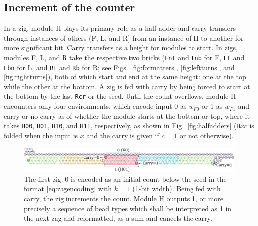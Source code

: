 \documentclass[twocolumn]{svjour3}
\begin{document}
\subsection{Increment of the counter}
In a zig, module H plays its primary role as a half-adder and carry transfers through instances of others (F, L, and R) from an instance of H to another for more significant bit.
Carry transfers as a height for modules to start.
In zigs, modules F, L, and R take the respective two bricks (\texttt{Fnt} and \texttt{Fnb} for F, \texttt{Lt} and \texttt{Lbn} for L, and \texttt{Rt} and \texttt{Rb} for R; see Figs.~\ref{fig:formatters}, \ref{fig:leftturns}, and \ref{fig:rightturns}), both of which start and end at the same height: one at the top while the other at the bottom.
A zig is fed with carry by being forced to start at the bottom by the last \texttt{Rcr} or the seed.
Until the count overflows, module H encounters only four environments, which encode input 0 as $w_{F0}$ or 1 as $w_{F1}$ and carry or no-carry as of whether the module starts at the bottom or top, where it takes \texttt{H00}, \texttt{H01}, \texttt{H10}, and \texttt{H11}, respectively, as shown in Fig.~\ref{fig:halfadders} (\texttt{H}$xc$ is folded when the input is $x$ and the carry is given if $c=1$ or not otherwise).

\begin{figure}[tb]
\centering
\includegraphics[width=0.9\linewidth]{fig/svg/CounterEx5_1.pdf}
\caption{
The first zig.
0 is encoded as an initial count below the seed in the format \eqref{eq:zagencoding} with $k = 1$ (1-bit width).
Being fed with carry, the zig increments the count.
Module H outputs 1, or more precisely a sequence of bead types which shall be interpreted as 1 in the next zag and reformatted, as a sum and cancels the carry.
}

\label{fig:counter1stzig}
\end{figure}
\end{document}
